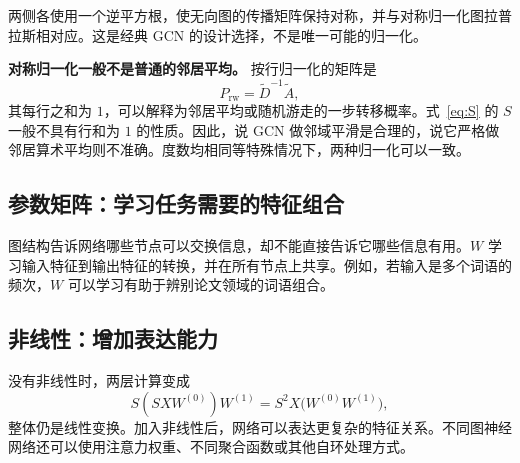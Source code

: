\documentclass[UTF8,a4paper,11pt,fontset=fandol]{ctexart}
\begin{document}
两侧各使用一个逆平方根，使无向图的传播矩阵保持对称，并与对称归一化图拉普拉斯相对应。这是经典 GCN 的设计选择，不是唯一可能的归一化。

\textbf{对称归一化一般不是普通的邻居平均。} 按行归一化的矩阵是
\begin{equation}
P_{\mathrm{rw}}=\widetilde D^{-1}\widetilde A,
\end{equation}
其每行之和为 $1$，可以解释为邻居平均或随机游走的一步转移概率。式~\eqref{eq:S} 的 $S$ 一般不具有行和为 $1$ 的性质。因此，说 GCN 做邻域平滑是合理的，说它严格做邻居算术平均则不准确。度数均相同等特殊情况下，两种归一化可以一致。

\subsection{参数矩阵：学习任务需要的特征组合}
图结构告诉网络哪些节点可以交换信息，却不能直接告诉它哪些信息有用。$W$ 学习输入特征到输出特征的转换，并在所有节点上共享。例如，若输入是多个词语的频次，$W$ 可以学习有助于辨别论文领域的词语组合。

\subsection{非线性：增加表达能力}
没有非线性时，两层计算变成
\begin{equation}
S(SXW^{(0)})W^{(1)}
=S^2X\bigl(W^{(0)}W^{(1)}\bigr),
\end{equation}
整体仍是线性变换。加入非线性后，网络可以表达更复杂的特征关系。不同图神经网络还可以使用注意力权重、不同聚合函数或其他自环处理方式。
\end{document}
